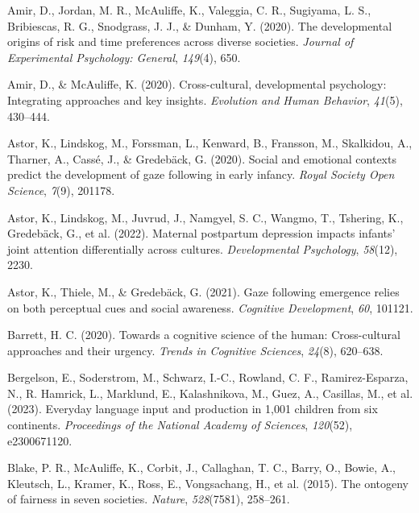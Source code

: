 \documentclass[
  man,floatsintext]{apa7}
\newlength{\cslhangindent}
\newlength{\cslentryspacingunit} %
\newenvironment{CSLReferences}[2] %
 {%
  \setlength{\parindent}{0pt}
  \ifodd #1
  \let\oldpar\par
  \def\par{\hangindent=\cslhangindent\oldpar}
  \fi
  \setlength{\parskip}{#2\cslentryspacingunit}
 }%
 {}
\begin{document}
\hypertarget{refs}{}
\begin{CSLReferences}{1}{0}
\leavevmode{}%
Amir, D., Jordan, M. R., McAuliffe, K., Valeggia, C. R., Sugiyama, L. S., Bribiescas, R. G., Snodgrass, J. J., \& Dunham, Y. (2020). The developmental origins of risk and time preferences across diverse societies. \emph{Journal of Experimental Psychology: General}, \emph{149}(4), 650.

\leavevmode{}%
Amir, D., \& McAuliffe, K. (2020). Cross-cultural, developmental psychology: Integrating approaches and key insights. \emph{Evolution and Human Behavior}, \emph{41}(5), 430--444.

\leavevmode{}%
Astor, K., Lindskog, M., Forssman, L., Kenward, B., Fransson, M., Skalkidou, A., Tharner, A., Cassé, J., \& Gredebäck, G. (2020). Social and emotional contexts predict the development of gaze following in early infancy. \emph{Royal Society Open Science}, \emph{7}(9), 201178.

\leavevmode{}%
Astor, K., Lindskog, M., Juvrud, J., Namgyel, S. C., Wangmo, T., Tshering, K., Gredebäck, G., et al. (2022). Maternal postpartum depression impacts infants' joint attention differentially across cultures. \emph{Developmental Psychology}, \emph{58}(12), 2230.

\leavevmode{}%
Astor, K., Thiele, M., \& Gredebäck, G. (2021). Gaze following emergence relies on both perceptual cues and social awareness. \emph{Cognitive Development}, \emph{60}, 101121.

\leavevmode{}%
Barrett, H. C. (2020). Towards a cognitive science of the human: Cross-cultural approaches and their urgency. \emph{Trends in Cognitive Sciences}, \emph{24}(8), 620--638.

\leavevmode{}%
Bergelson, E., Soderstrom, M., Schwarz, I.-C., Rowland, C. F., Ramirez-Esparza, N., R. Hamrick, L., Marklund, E., Kalashnikova, M., Guez, A., Casillas, M., et al. (2023). Everyday language input and production in 1,001 children from six continents. \emph{Proceedings of the National Academy of Sciences}, \emph{120}(52), e2300671120.

\leavevmode{}%
Blake, P. R., McAuliffe, K., Corbit, J., Callaghan, T. C., Barry, O., Bowie, A., Kleutsch, L., Kramer, K., Ross, E., Vongsachang, H., et al. (2015). The ontogeny of fairness in seven societies. \emph{Nature}, \emph{528}(7581), 258--261.


\end{CSLReferences}
\end{document}
